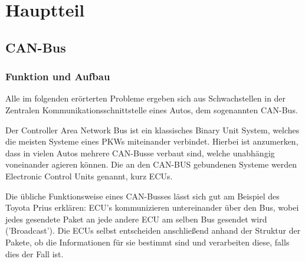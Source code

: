 \documentclass[
    fontsize=12pt,
    headings=small,
    parskip=half,           %
    bibliography=totoc,9
    numbers=noenddot,       %
    open=any,               %
    ]{scrreprt}
\begin{document}


\chapter{Hauptteil}
\section{CAN-Bus}
\subsection{Funktion und Aufbau}
Alle im folgenden erörterten Probleme ergeben sich aus Schwachstellen in der Zentralen Kommunikationsschnittstelle eines Autos, dem sogenannten CAN-Bus.\par
Der Controller Area Network Bus ist ein klassisches Binary Unit System, welches die meisten Systeme eines PKWs miteinander verbindet. Hierbei ist anzumerken, dass in vielen Autos mehrere CAN-Busse verbaut sind, welche unabhängig voneinander agieren können. Die an den CAN-BUS gebundenen Systeme werden Electronic Control Units genannt, kurz ECUs.\par
Die übliche Funktionsweise eines CAN-Busses lässt sich gut am Beispiel des Toyota Prius erklären: ECU's kommunizieren untereinander über den Bus, wobei jedes gesendete Paket an jede andere ECU am selben Bus gesendet wird ('Broadcast'). Die ECUs selbst entscheiden anschließend anhand der Struktur der Pakete, ob die Informationen für sie bestimmt sind und verarbeiten diese, falls dies der Fall ist.\par
\end{document}
